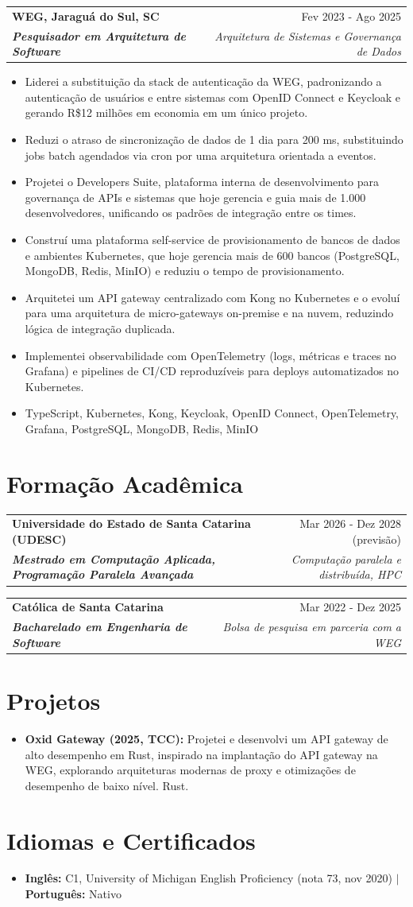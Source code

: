\documentclass[a4paper,9pt]{extarticle}
\makeatletter
\newcommand{\role}[4]{%
  \begin{tabularx}{\linewidth}{@{}X r@{}}
    \textcolor[HTML]{1C033C}{\textbf{#1}} & \textcolor[HTML]{371e77}{#2} \\[1pt]
    \textcolor[HTML]{371e77}{\textbf{\textit{#3}}} & \textcolor[HTML]{4B28A4}{\textit{#4}} \\
  \end{tabularx}\par\vspace{1pt}%
}
\makeatother
\begin{document}
\role{WEG, Jaraguá do Sul, SC}{Fev 2023 - Ago 2025}{Pesquisador em Arquitetura de Software}{Arquitetura de Sistemas e Governança de Dados}
\begin{itemize}
    \item Liderei a substituição da stack de autenticação da WEG, padronizando a autenticação de usuários e entre sistemas com OpenID Connect e Keycloak e gerando R\$12 milhões em economia em um único projeto.
    \item Reduzi o atraso de sincronização de dados de 1 dia para 200 ms, substituindo jobs batch agendados via cron por uma arquitetura orientada a eventos.
    \item Projetei o Developers Suite, plataforma interna de desenvolvimento para governança de APIs e sistemas que hoje gerencia e guia mais de 1.000 desenvolvedores, unificando os padrões de integração entre os times.
    \item Construí uma plataforma self-service de provisionamento de bancos de dados e ambientes Kubernetes, que hoje gerencia mais de 600 bancos (PostgreSQL, MongoDB, Redis, MinIO) e reduziu o tempo de provisionamento.
    \item Arquitetei um API gateway centralizado com Kong no Kubernetes e o evoluí para uma arquitetura de micro-gateways on-premise e na nuvem, reduzindo lógica de integração duplicada.
    \item Implementei observabilidade com OpenTelemetry (logs, métricas e traces no Grafana) e pipelines de CI/CD reproduzíveis para deploys automatizados no Kubernetes.
    \item TypeScript, Kubernetes, Kong, Keycloak, OpenID Connect, OpenTelemetry, Grafana, PostgreSQL, MongoDB, Redis, MinIO
\end{itemize}

\section{Formação Acadêmica}
\role{Universidade do Estado de Santa Catarina (UDESC)}{Mar 2026 - Dez 2028 (previsão)}{Mestrado em Computação Aplicada, Programação Paralela Avançada}{Computação paralela e distribuída, HPC}
\role{Católica de Santa Catarina}{Mar 2022 - Dez 2025}{Bacharelado em Engenharia de Software}{Bolsa de pesquisa em parceria com a WEG}

\section{Projetos}
\begin{itemize}
    \item \textbf{Oxid Gateway (2025, TCC):} Projetei e desenvolvi um API gateway de alto desempenho em Rust, inspirado na implantação do API gateway na WEG, explorando arquiteturas modernas de proxy e otimizações de desempenho de baixo nível. Rust.
\end{itemize}

\section{Idiomas e Certificados}
\begin{itemize}
    \item \textbf{Inglês:} C1, University of Michigan English Proficiency (nota 73, nov 2020) $|$ \textbf{Português:} Nativo
\end{itemize}
\end{document}
